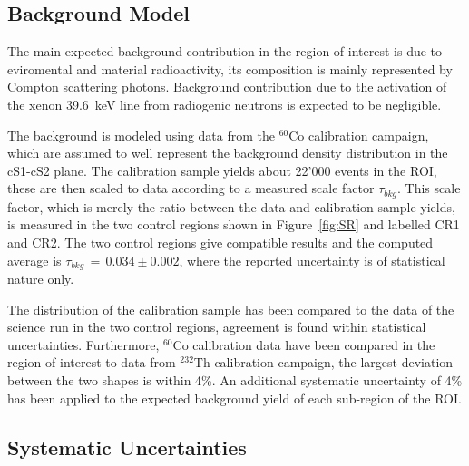 \subsection {Background Model}

The main expected background contribution in the region of interest is due to eviromental and material radioactivity, its composition is mainly
represented by Compton scattering photons. Background contribution due to the activation of the xenon 39.6~keV line from radiogenic neutrons is expected to be negligible.

The background is modeled using data from the $^{60}$Co calibration campaign, which are assumed to well represent the background density distribution 
in the cS1-cS2 plane. 
The calibration sample yields  about 22'000 events in the ROI, these are then scaled to data according to a measured scale factor $\tau_{bkg}$.
This scale factor, which is merely the ratio between the data and calibration sample yields, is measured in the two control regions shown in Figure~\ref{fig:SR} and labelled CR1 and CR2. The two control 
regions give compatible results and the computed average is $\tau_{bkg} \, =  \, 0.034 \pm 0.002 $, where the reported uncertainty 
is of statistical nature only.

The distribution of the calibration sample has been compared to the data of the science run in the two control regions,
agreement is found within statistical uncertainties. Furthermore, $^{60}$Co calibration data have been compared in the region of interest to  
data from $^{232}$Th calibration campaign, the largest deviation between the two shapes is within 4\%. An additional systematic
uncertainty of 4\% has been applied to the expected background yield of each sub-region of the ROI.




\subsection{Systematic Uncertainties}

